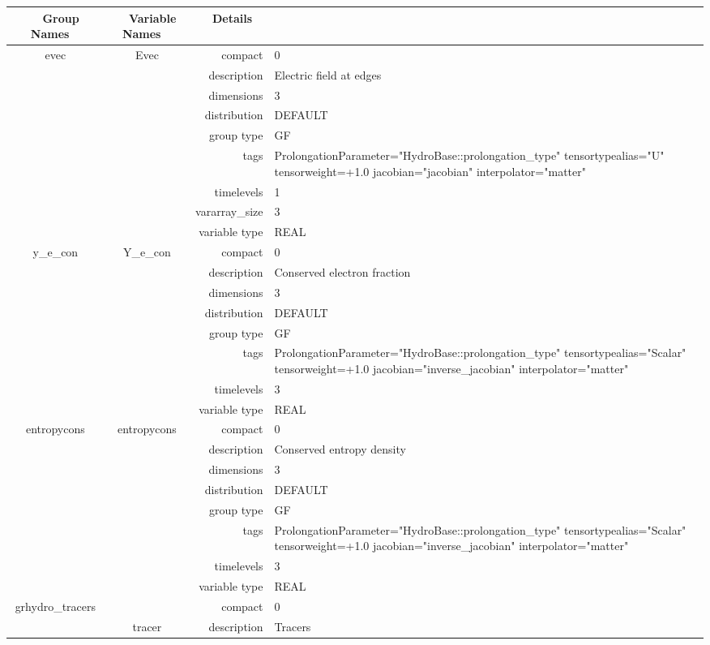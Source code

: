 \begin{tabular*}{150mm}{|c|c@{\extracolsep{\fill}}|rl|} \hline 
~ {\bf Group Names} ~ & ~ {\bf Variable Names} ~  &{\bf Details} ~ & ~ \\ 
\hline 
evec & Evec & compact & 0 \\ 
 &  & description & Electric field at edges \\ 
 &  & dimensions & 3 \\ 
 &  & distribution & DEFAULT \\ 
 &  & group type & GF \\ 
 &  & tags & ProlongationParameter="HydroBase::prolongation\_type" tensortypealias="U" tensorweight=+1.0 jacobian="jacobian" interpolator="matter" \\ 
 &  & timelevels & 1 \\ 
 &  & vararray\_size & 3 \\ 
 &  & variable type & REAL \\ 
\hline 
y\_e\_con & Y\_e\_con & compact & 0 \\ 
 &  & description & Conserved electron fraction \\ 
 &  & dimensions & 3 \\ 
 &  & distribution & DEFAULT \\ 
 &  & group type & GF \\ 
 &  & tags & ProlongationParameter="HydroBase::prolongation\_type" tensortypealias="Scalar" tensorweight=+1.0 jacobian="inverse\_jacobian" interpolator="matter" \\ 
 &  & timelevels & 3 \\ 
 &  & variable type & REAL \\ 
\hline 
entropycons & entropycons & compact & 0 \\ 
 &  & description & Conserved entropy density \\ 
 &  & dimensions & 3 \\ 
 &  & distribution & DEFAULT \\ 
 &  & group type & GF \\ 
 &  & tags & ProlongationParameter="HydroBase::prolongation\_type" tensortypealias="Scalar" tensorweight=+1.0 jacobian="inverse\_jacobian" interpolator="matter" \\ 
 &  & timelevels & 3 \\ 
 &  & variable type & REAL \\ 
\hline 
grhydro\_tracers &  & compact & 0 \\ 
 & tracer & description & Tracers \\ 

\end{tabular*}
